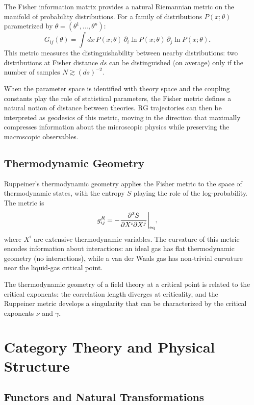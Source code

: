 \documentclass[12pt,a4paper,oneside]{book}
\theoremstyle{definition}
\theoremstyle{plain}
\theoremstyle{remark}
\begin{document}
The Fisher information matrix provides a natural Riemannian metric on the
manifold of probability distributions. For a family of distributions
$P(x;\theta)$ parametrized by $\theta = (\theta^1,\ldots,\theta^n)$:
\begin{equation}
G_{ij}(\theta) = \int dx\,P(x;\theta)\,\partial_i\ln P(x;\theta)\,\partial_j\ln P(x;\theta).
\end{equation}
This metric measures the distinguishability between nearby distributions:
two distributions at Fisher distance $ds$ can be distinguished (on average)
only if the number of samples $N \gtrsim (ds)^{-2}$.

When the parameter space is identified with theory space and the coupling
constants play the role of statistical parameters, the Fisher metric defines
a natural notion of distance between theories. RG trajectories can then be
interpreted as geodesics of this metric, moving in the direction that
maximally compresses information about the microscopic physics while
preserving the macroscopic observables.

\section{Thermodynamic Geometry}

Ruppeiner's thermodynamic geometry applies the Fisher metric to the space
of thermodynamic states, with the entropy $S$ playing the role of the
log-probability. The metric is
\begin{equation}
g^R_{ij} = -\frac{\partial^2 S}{\partial X^i\partial X^j}\bigg|_{\rm eq},
\end{equation}
where $X^i$ are extensive thermodynamic variables. The curvature of this
metric encodes information about interactions: an ideal gas has flat
thermodynamic geometry (no interactions), while a van der Waals gas has
non-trivial curvature near the liquid-gas critical point.

The thermodynamic geometry of a field theory at a critical point is
related to the critical exponents: the correlation length diverges at
criticality, and the Ruppeiner metric develops a singularity that can
be characterized by the critical exponents $\nu$ and $\gamma$.

\chapter{Category Theory and Physical Structure}

\section{Functors and Natural Transformations}
\end{document}
